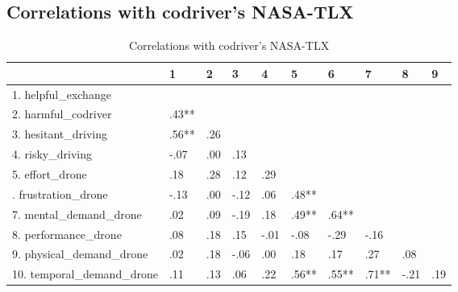 \documentclass[]{article}
\begin{document}
\hypertarget{correlations-with-codrivers-nasa-tlx}{%
\subsection{Correlations with codriver's
NASA-TLX}\label{correlations-with-codrivers-nasa-tlx}}

\begin{table}[H]

\caption{\label{tab:unnamed-chunk-20}Correlations with codriver's NASA-TLX}
\centering
\fontsize{6}{8}\selectfont
\begin{tabular}[t]{llllllllll}
\toprule
  & 1 & 2 & 3 & 4 & 5 & 6 & 7 & 8 & 9\\
\midrule
1. helpful\_exchange &  &  &  &  &  &  &  &  & \\
2. harmful\_codriver & .43** &  &  &  &  &  &  &  & \\
3. hesitant\_driving & .56** & .26 &  &  &  &  &  &  & \\
4. risky\_driving & -.07 & .00 & .13 &  &  &  &  &  & \\
5. effort\_drone & .18 & .28 & .12 & .29 &  &  &  &  & \\
\addlinespace
6. frustration\_drone & -.13 & .00 & -.12 & .06 & .48** &  &  &  & \\
7. mental\_demand\_drone & .02 & .09 & -.19 & .18 & .49** & .64** &  &  & \\
8. performance\_drone & .08 & .18 & .15 & -.01 & -.08 & -.29 & -.16 &  & \\
9. physical\_demand\_drone & .02 & .18 & -.06 & .00 & .18 & .17 & .27 & .08 & \\
10. temporal\_demand\_drone & .11 & .13 & .06 & .22 & .56** & .55** & .71** & -.21 & .19\\
\bottomrule
\end{tabular}
\end{table}
\end{document}
